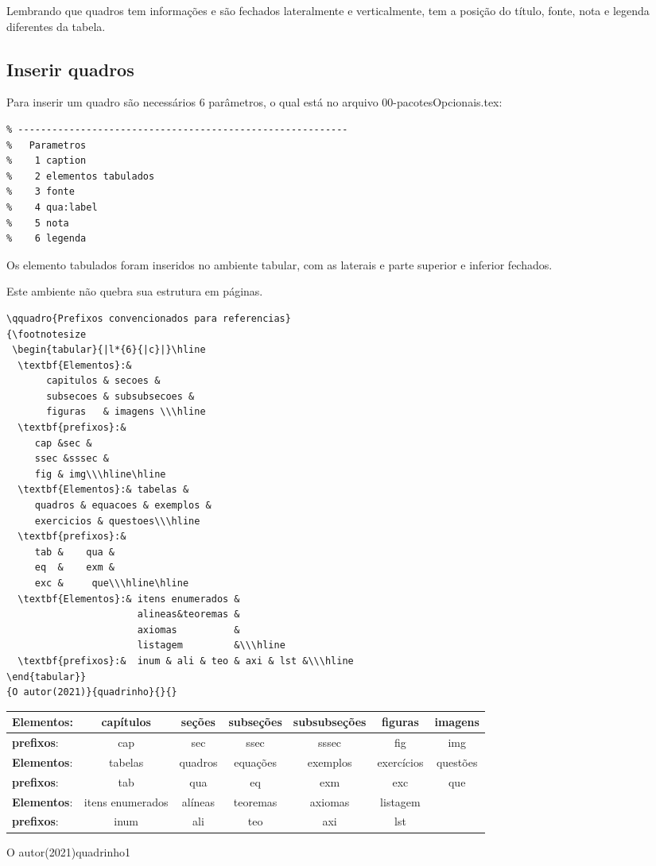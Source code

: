 Lembrando que quadros tem informações e são fechados lateralmente e verticalmente, tem a posição do título, fonte, nota e legenda diferentes da tabela.
\subsection[Quadros]{Inserir quadros}\label{ssec:quadros}

Para inserir um quadro são necessários 6 parâmetros, o qual está no arquivo 00-pacotesOpcionais.tex:

\begin{lstlisting}
% ----------------------------------------------------------
%   Parametros
%    1 caption
%    2 elementos tabulados
%    3 fonte
%    4 qua:label
%    5 nota
%    6 legenda
\end{lstlisting}

Os elemento tabulados foram inseridos no ambiente tabular, com as laterais e parte superior e inferior fechados.

Este ambiente não quebra sua estrutura em páginas.

\begin{lstlisting}
\qquadro{Prefixos convencionados para referencias}
{\footnotesize
 \begin{tabular}{|l*{6}{|c}|}\hline
  \textbf{Elementos}:& 
       capitulos & secoes & 
       subsecoes & subsubsecoes &
       figuras   & imagens \\\hline
  \textbf{prefixos}:&
     cap &sec &
     ssec &sssec &
     fig & img\\\hline\hline
  \textbf{Elementos}:& tabelas &
     quadros & equacoes & exemplos &
     exercicios & questoes\\\hline	
  \textbf{prefixos}:&
     tab &    qua & 
     eq  &    exm & 
     exc &     que\\\hline\hline
  \textbf{Elementos}:& itens enumerados &
                       alineas&teoremas &
                       axiomas          & 
                       listagem         &\\\hline
  \textbf{prefixos}:&  inum & ali & teo & axi & lst &\\\hline
\end{tabular}}
{O autor(2021)}{quadrinho}{}{}
\end{lstlisting}

{\footnotesize
 \begin{tabular}{|l*{6}{|c}|}\hline
  \textbf{Elementos}:& capítulos& 	seções&	subseções&	subsubseções&	
  figuras&	imagens \\\hline
  \textbf{prefixos}:&cap&sec&ssec&sssec&fig & img\\\hline\hline
  \textbf{Elementos}:&tabelas&	quadros&	
  equações& exemplos& exercícios & questões\\\hline	
  \textbf{prefixos}:&tab&qua&eq& exm & exc&que\\\hline\hline
  \textbf{Elementos}:&itens enumerados& alíneas&teoremas&	axiomas & listagem &\\\hline
  \textbf{prefixos}:&inum &ali&teo& axi &lst&\\\hline
\end{tabular}}
{O autor(2021)}{quadrinho1}{}{}


